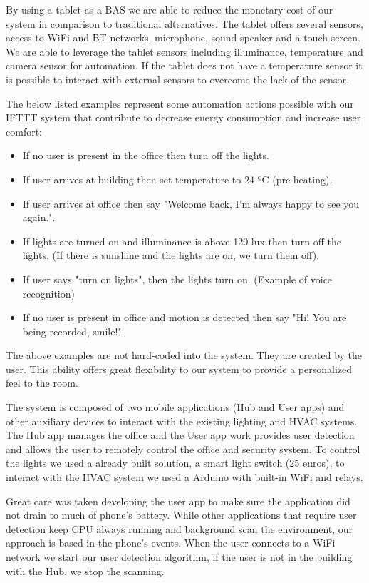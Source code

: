 By using a tablet as a \ac{BAS} we are able to reduce the monetary cost of our system in comparison to traditional alternatives. The tablet offers several sensors, access to \ac{WiFi} and \ac{BT} networks, microphone, sound speaker and a touch screen. We are able to leverage the tablet sensors including illuminance, temperature and camera sensor for automation. If the tablet does not have a temperature sensor it is possible to interact with external sensors to overcome the lack of the sensor.


The below listed examples represent some automation actions possible with our \ac{IFTTT} system that contribute to decrease energy consumption and increase user comfort:

\begin{itemize}
\item If no user is present in the office then turn off the lights.
\item If user arrives at building then set temperature to 24 ºC (pre-heating). 
\item If user arrives at office then say "Welcome back, I'm always happy to see you again.".
\item If lights are turned on and illuminance is above 120 lux then turn off the lights. (If there is  sunshine and the lights are on, we turn them off).
\item If user says "turn on lights", then the lights turn on. (Example of voice recognition)
\item If no user is present in office and motion is detected then say "Hi! You are being recorded, smile!".
\end{itemize}

The above examples are not hard-coded into the system. They are created by the user. This ability offers great flexibility to our system to provide a personalized feel to the room.

The system is composed of two mobile applications (Hub and User apps) and other auxiliary devices to interact with the existing lighting and \ac{HVAC} systems. The Hub app manages the office and the User app work provides user detection and allows the user to remotely control the office and security system. To control the lights we used a already built solution, a smart light switch (25 euros), to interact with the \ac{HVAC} system we used a Arduino with built-in \ac{WiFi} and relays.

Great care was taken developing the user app to make sure the application did not drain to much of phone's battery. While other applications that require user detection keep \ac{CPU} always running and background scan the environment, our approach is based in the phone's events. When the user connects to a \ac{WiFi} network we start our user detection algorithm, if the user is not in the building with the Hub, we stop the scanning. 

